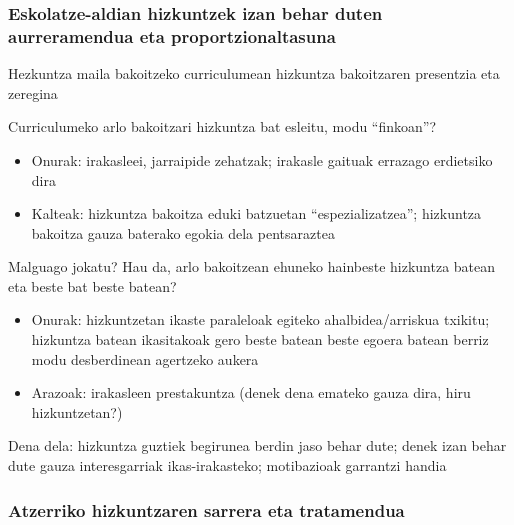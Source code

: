 \documentclass[
]{book}
\providecommand{\tightlist}{%
  \setlength{\itemsep}{0pt}\setlength{\parskip}{0pt}}
\begin{document}
\hypertarget{eskolatze-aldian-hizkuntzek-izan-behar-duten-aurreramendua-eta-proportzionaltasuna}{%
\subsubsection*{Eskolatze-aldian hizkuntzek izan behar duten aurreramendua eta proportzionaltasuna}\label{eskolatze-aldian-hizkuntzek-izan-behar-duten-aurreramendua-eta-proportzionaltasuna}}

Hezkuntza maila bakoitzeko curriculumean hizkuntza bakoitzaren presentzia eta zeregina

Curriculumeko arlo bakoitzari hizkuntza bat esleitu, modu ``finkoan''?

\begin{itemize}
\tightlist
\item
  Onurak: irakasleei, jarraipide zehatzak; irakasle gaituak errazago erdietsiko dira
\item
  Kalteak: hizkuntza bakoitza eduki batzuetan ``espezializatzea''; hizkuntza bakoitza gauza baterako egokia dela pentsaraztea
\end{itemize}

Malguago jokatu? Hau da, arlo bakoitzean ehuneko hainbeste hizkuntza batean eta beste bat beste batean?

\begin{itemize}
\tightlist
\item
  Onurak: hizkuntzetan ikaste paraleloak egiteko ahalbidea/arriskua txikitu; hizkuntza batean ikasitakoak gero beste batean beste egoera batean berriz modu desberdinean agertzeko aukera
\item
  Arazoak: irakasleen prestakuntza (denek dena emateko gauza dira, hiru hizkuntzetan?)
\end{itemize}

Dena dela: hizkuntza guztiek begirunea berdin jaso behar dute; denek izan behar dute gauza interesgarriak ikas-irakasteko; motibazioak garrantzi handia

\hypertarget{atzerriko-hizkuntzaren-sarrera-eta-tratamendua}{%
\subsubsection*{Atzerriko hizkuntzaren sarrera eta tratamendua}\label{atzerriko-hizkuntzaren-sarrera-eta-tratamendua}}
\end{document}
